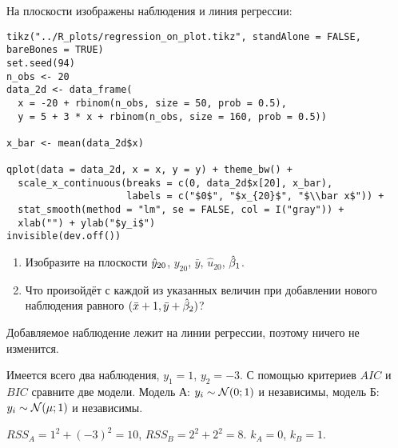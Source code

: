 \begin{problem}
На плоскости изображены наблюдения и линия регрессии:



\begin{verbatim}
tikz("../R_plots/regression_on_plot.tikz", standAlone = FALSE, bareBones = TRUE)
set.seed(94)
n_obs <- 20
data_2d <- data_frame(
  x = -20 + rbinom(n_obs, size = 50, prob = 0.5),
  y = 5 + 3 * x + rbinom(n_obs, size = 160, prob = 0.5))

x_bar <- mean(data_2d$x)

qplot(data = data_2d, x = x, y = y) + theme_bw() +
  scale_x_continuous(breaks = c(0, data_2d$x[20], x_bar),
                     labels = c("$0$", "$x_{20}$", "$\\bar x$")) +
  stat_smooth(method = "lm", se = FALSE, col = I("gray")) +
  xlab("") + ylab("$y_i$")
invisible(dev.off())
\end{verbatim}




\begin{minipage}{\textwidth}
\begin{tikzpicture}[scale = 0.025]

\end{tikzpicture}
\end{minipage}


\begin{enumerate}
\item Изобразите на плоскости $\hy_{20}$, $y_{20}$, $\bar y$, $\hat u_{20}$, $\hb_1$.
\item Что произойдёт с каждой из указанных величин при добавлении нового наблюдения равного $(\bar x + 1, \bar y + \hb_2)$?
\end{enumerate}
\begin{sol}
Добавляемое наблюдение лежит на линии регрессии, поэтому ничего не изменится.
\end{sol}
\end{problem}


\begin{problem}
  Имеется всего два наблюдения, $y_1 = 1$, $y_2 = -3$. С помощью критериев $AIC$ и $BIC$ сравните две модели. Модель А: $y_i \sim \cN(0; 1)$ и независимы, модель Б: $y_i \sim \cN(\mu; 1)$ и независимы.
\begin{sol}
  $RSS_A = 1^2 + (-3)^2 = 10$, $RSS_B= 2^2 + 2^2 = 8$. $k_A = 0$, $k_B=1$.
\end{sol}
\end{problem}


